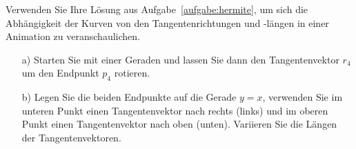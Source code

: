 %
Verwenden Sie Ihre Lösung aus Aufgabe~\ref{aufgabe:hermite}, um sich die 
Abhängigkeit der Kurven von den Tangentenrichtungen und -längen in einer 
Animation zu veranschaulichen.
\begin{itemize}
  \item[a)] Starten Sie mit einer Geraden und lassen Sie dann den
            Tangentenvektor $r_4$ um den Endpunkt $p_4$ rotieren.
  \item[b)] Legen Sie die beiden Endpunkte auf die Gerade $y = x$,
            verwenden Sie im unteren Punkt einen Tangentenvektor nach 
            rechts (links) und im oberen Punkt einen Tangentenvektor 
            nach oben (unten). Variieren Sie die Längen der 
            Tangentenvektoren.
\end{itemize}
  